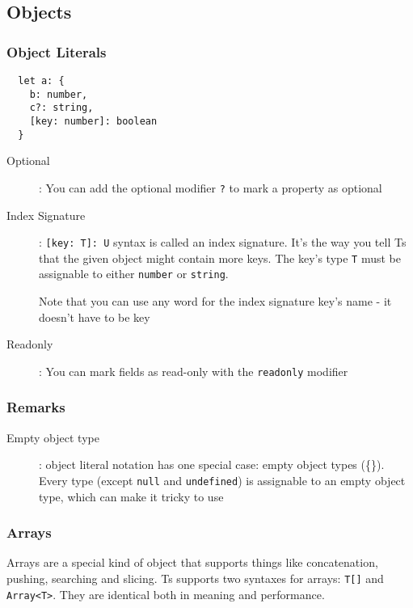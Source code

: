 \documentclass[french]{article}
\begin{document}
\subsection{Objects}

\subsubsection{Object Literals}

\begin{lstlisting}
  let a: {
    b: number,
    c?: string,
    [key: number]: boolean
  }
\end{lstlisting}

\begin{description}
  \item[Optional]: You can add the optional modifier \lstinline{?} to mark a property as optional
  \item[Index Signature]: 
    \lstinline{[key: T]: U} syntax is called an index signature. It's the way you tell Ts that the given object might contain more keys. The key's type \lstinline{T} must be assignable to either \lstinline{number} or \lstinline{string}.

    Note that you can use any word for the index signature key's name - it doesn't have to be key
  \item[Readonly]: You can mark fields as read-only with the \lstinline{readonly} modifier
\end{description}


\subsubsection*{Remarks}

\begin{description}
  \item[Empty object type]: object literal notation has one special case: empty object types (\{\}). Every type (except \lstinline{null} and \lstinline{undefined}) is assignable to an empty object type, which can make it tricky to use

\end{description}

\subsubsection{Arrays}

Arrays are a special kind of object that supports things like concatenation, pushing, searching and slicing. Ts supports two syntaxes for arrays: \lstinline{T[]} and \lstinline{Array<T>}. They are identical both in meaning and performance.
\end{document}
